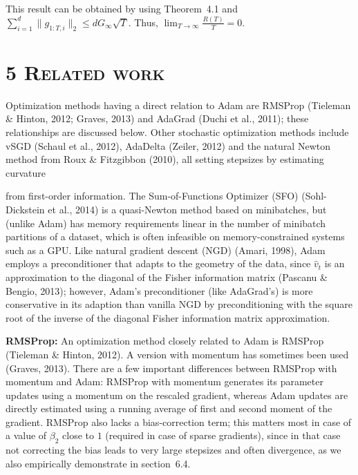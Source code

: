 \documentclass[11pt]{article}
\begin{document}
\noindent
This result can be obtained by using Theorem~4.1 and
$\sum_{i=1}^{d} \|g_{1:T,i}\|_2 \leq dG_\infty\sqrt{T}$. Thus,
$\lim_{T \to \infty} \frac{R(T)}{T} = 0$.

\vspace{0.5em}

\section*{5 \textsc{Related work}}

Optimization methods having a direct relation to Adam are RMSProp
(Tieleman \& Hinton, 2012; Graves, 2013) and AdaGrad (Duchi et al.,
2011); these relationships are discussed below. Other stochastic
optimization methods include vSGD (Schaul et al., 2012), AdaDelta
(Zeiler, 2012) and the natural Newton method from Roux \&
Fitzgibbon (2010), all setting stepsizes by estimating curvature


\newpage

\setcounter{equation}{5}

\noindent
from first-order information. The Sum-of-Functions Optimizer
(SFO) (Sohl-Dickstein et al., 2014) is a quasi-Newton method
based on minibatches, but (unlike Adam) has memory requirements
linear in the number of minibatch partitions of a dataset, which
is often infeasible on memory-constrained systems such as a GPU.
Like natural gradient descent (NGD) (Amari, 1998), Adam employs
a preconditioner that adapts to the geometry of the data, since
$\widehat{v}_t$ is an approximation to the diagonal of the Fisher
information matrix (Pascanu \& Bengio, 2013); however, Adam's
preconditioner (like AdaGrad's) is more conservative in its
adaption than vanilla NGD by preconditioning with the square root
of the inverse of the diagonal Fisher information matrix
approximation.

\vspace{0.5em}

\noindent\textbf{RMSProp:} An optimization method closely related
to Adam is RMSProp (Tieleman \& Hinton, 2012). A version with
momentum has sometimes been used (Graves, 2013). There are a few
important differences between RMSProp with momentum and Adam:
RMSProp with momentum generates its parameter updates using a
momentum on the rescaled gradient, whereas Adam updates are
directly estimated using a running average of first and second
moment of the gradient. RMSProp also lacks a bias-correction
term; this matters most in case of a value of $\beta_2$ close to
$1$ (required in case of sparse gradients), since in that case
not correcting the bias leads to very large stepsizes and often
divergence, as we also empirically demonstrate in section~6.4.
\end{document}
